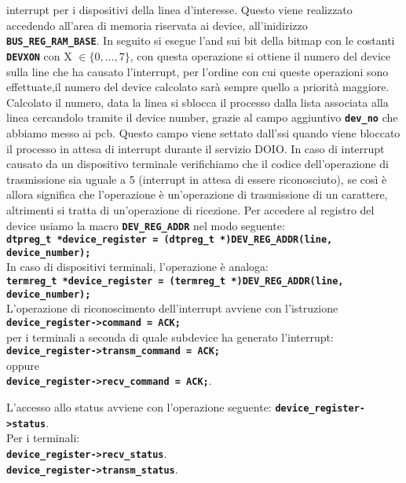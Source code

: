 \documentclass{article}
\begin{document}
	interrupt per i dispositivi della linea d'interesse. Questo viene realizzato accedendo
	all'area di memoria riservata ai device, all'inidirizzo \texttt{\textbf{BUS\_REG\_RAM\_BASE}}.
	In seguito si esegue l'and sui bit della bitmap con le costanti \texttt{\textbf{DEVXON}}
	con X $\in \{0, \ldots, 7\}$, con questa operazione si ottiene il numero del
	device sulla line che ha causato l'interrupt, per l'ordine con cui queste operazioni
	sono effettuate,il numero del device calcolato sarà sempre quello a priorità maggiore.
	Calcolato il numero, data la linea si sblocca il processo dalla lista associata
	alla linea cercandolo tramite il device number, grazie al campo aggiuntivo
	\texttt{\textbf{dev\_no}} che abbiamo messo ai pcb. Questo campo viene settato
	dall'ssi quando viene bloccato il processo in attesa di interrupt durante il
	servizio DOIO. In caso di interrupt causato da un dispositivo terminale verifichiamo
	che il codice dell'operazione di trasmissione sia uguale a 5 (interrupt in
	attesa di essere riconosciuto), se così è allora significa che l'operazione è
	un'operazione di trasmissione di un carattere, altrimenti si tratta di un'operazione
	di ricezione. Per accedere al registro del device usiamo la macro \texttt{\textbf{DEV\_REG\_ADDR}}
	nel modo seguente: \\ \texttt{\textbf{dtpreg\_t *device\_register = (dtpreg\_t
	*)DEV\_REG\_ADDR(line, device\_number);}} \\ In caso di dispositivi terminali,
	l'operazione è analoga: \\ \texttt{\textbf{termreg\_t *device\_register = (termreg\_t
	*)DEV\_REG\_ADDR(line, device\_number);}} \\ L'operazione di riconoscimento
	dell'interrupt avviene con l'istruzione\\ \texttt{\textbf{device\_register->command
	= ACK;}} \\per i terminali a seconda di quale subdevice ha generato l'interrupt:
	\\ \texttt{\textbf{device\_register->transm\_command = ACK;}} \\ oppure \\ \texttt{\textbf{device\_register->recv\_command
	= ACK;}}.

	L'accesso allo status avviene con l'operazione seguente: \texttt{\textbf{device\_register->status}}.
	\\ Per i terminali: \\ \texttt{\textbf{device\_register->recv\_status}}. \\
	\texttt{\textbf{device\_register->transm\_status}}.
\end{document}
